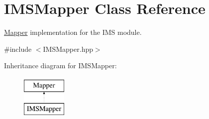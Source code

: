 \hypertarget{classIMSMapper}{
\section{IMSMapper Class Reference}
\label{classIMSMapper}
}


\hyperlink{classMapper}{Mapper} implementation for the IMS module.  




{\ttfamily \#include $<$IMSMapper.hpp$>$}

Inheritance diagram for IMSMapper:\begin{figure}[H]
\begin{center}
\leavevmode
\includegraphics[height=2.000000cm]{classIMSMapper}
\end{center}
\end{figure}
